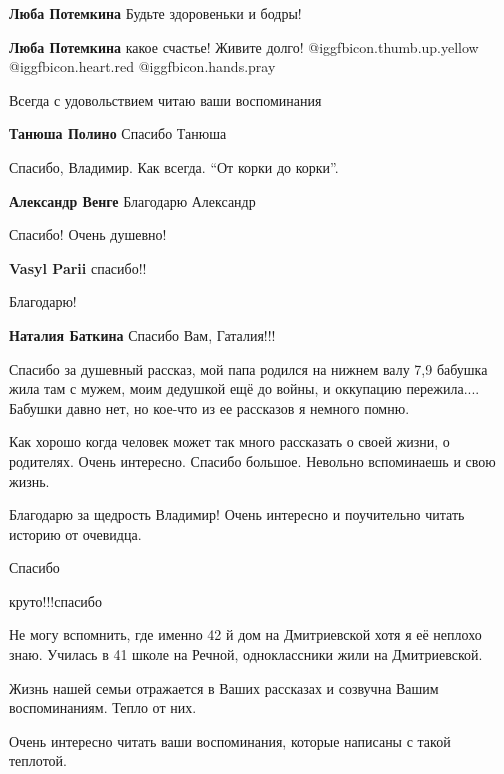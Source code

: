 \begin{itemize}
\begin{itemize}
\textbf{Люба Потемкина} Будьте здоровеньки и бодры!

\textbf{Люба Потемкина} какое счастье! Живите долго! @igg{fbicon.thumb.up.yellow} @igg{fbicon.heart.red} @igg{fbicon.hands.pray} 

\end{itemize} %

Всегда с удовольствием читаю ваши воспоминания

\textbf{Танюша Полино} Спасибо Танюша

Спасибо, Владимир. Как всегда. \enquote{От корки до корки}.

\textbf{Александр Венге} Благодарю Александр

Спасибо!
Очень душевно!

\textbf{Vasyl Parii} спасибо!!

Благодарю!

\textbf{Наталия Баткина} Спасибо Вам, Гаталия!!!


Спасибо за душевный рассказ, мой папа родился на нижнем валу 7,9 бабушка жила
там с мужем, моим дедушкой ещё до войны, и оккупацию пережила.... Бабушки давно
нет, но кое-что из ее рассказов я немного помню.



Как хорошо когда человек может так много рассказать о своей жизни, о родителях.
Очень интересно. Спасибо большое. Невольно вспоминаешь и свою жизнь.

Благодарю за щедрость Владимир! Очень интересно и поучительно читать историю от очевидца.

Спасибо

круто!!!спасибо


Не могу вспомнить, где именно 42 й дом на Дмитриевской хотя я её неплохо знаю.
Училась в 41 школе на Речной, одноклассники жили на Дмитриевской.

Жизнь нашей семьи отражается в Ваших рассказах и созвучна Вашим воспоминаниям. Тепло от них.


Очень интересно читать ваши воспоминания, которые написаны с такой теплотой.


\end{itemize}
